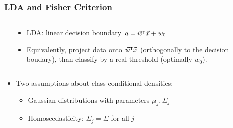 \begin{frame}
\frametitle{LDA and Fisher Criterion}
\begin{columns}
\begin{column}{.5\linewidth}
\end{column}
\begin{column}{.6\linewidth}
\begin{itemize}
\item LDA: linear decision boundary $a = \vec{w}^\intercal \vec{x} + w_0$
\pause
\item Equivalently, project data onto $\vec{w}^\intercal \vec{x}$ (orthogonally to the decision boudary), than classify by a real threshold (optimally $w_0$). \\
\end{itemize}
\end{column}
\end{columns}
\pause
\begin{itemize}
\item Two assumptions about class-conditional densities: 
\begin{itemize}
\item Gaussian distributions with parameters $\mu_j, \Sigma_j$
\item Homoscedasticity: $\Sigma_j=\Sigma$ for all $j$
\end{itemize}
\end{itemize}


\end{frame}
